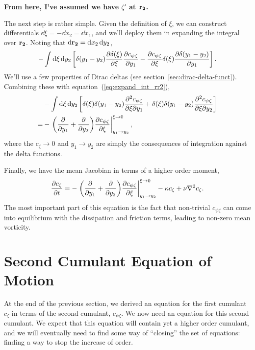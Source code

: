 \documentclass{paper}
\newcommand{\cz}{c_\zeta}
\newcommand{\cpz}{c_{\psi\zeta}}
\newcommand{\rr}[1]{\vb{r_{#1}}}
\begin{document}
\textbf{From here, I've assumed we have $\zeta'$ at $\rr2$.}

The next step is rather simple. Given the definition of $\xi$, we can construct differentials $\dd{\xi} = -\dd{x_2} = \dd{x_1}$, and we'll deploy them in expanding the integral over $\rr2$. Noting that $\dd{\rr2} = \dd{x_2}\dd{y_2}$,
\begin{equation}
  \label{eq:expand_int_rr2}
  - \int \dd{\xi} \dd{y_2} \left[ \delta(y_1 - y_2)\pdv{\delta(\xi)}{\xi} \pdv{\cpz}{y_1} - \pdv{\cpz}{\xi} \delta(\xi)\pdv{\delta(y_1 - y_2)}{y_1}\right].
\end{equation}
We'll use a few properties of Dirac deltas (see section~\ref{sec:dirac-delta-funct}). Combining these with equation~(\ref{eq:expand_int_rr2}),
\begin{equation}
  \label{eq:expand_int_rr2_dirac}
  \begin{split}
    & - \int \dd{\xi} \dd{y_2} \left[ \delta(\xi)\delta(y_1 - y_2)\pdv{\cpz}{\xi}{y_1} + \delta(\xi)\delta(y_1 - y_2)\pdv{\cpz}{\xi}{y_2}\right]\\
    = & -\eval{\qty(\pdv{y_1} + \pdv{y_2}) \pdv{\cpz}{\xi}}_{y_1 \to y_2}^{\xi \to 0},
  \end{split}
\end{equation}
where the $\cz \to 0$ and $y_1 \to y_2$ are simply the consequences of integration against the delta functions.

Finally, we have the mean Jacobian in terms of a higher order moment,
\begin{equation}
  \label{eq:first_cumulant_EOM}
  \pdv{\cz}{t} = -\eval{\qty(\pdv{y_1} + \pdv{y_2}) \pdv{\cpz}{\xi}}_{y_1 \to y_2}^{\xi \to 0} - \kappa \cz + \nu \laplacian{\cz}.
\end{equation}
The most important part of this equation is the fact that non-trivial $\cpz$ can come into equilibrium with the dissipation and friction terms, leading to non-zero mean vorticity.

\section{Second Cumulant Equation of Motion}
\label{sec:second-cumul-equat}
At the end of the previous section, we derived an equation for the first cumulant $\cz$ in terms of the second cumulant, $\cpz$. We now need an equation for this second cumulant. We expect that this equation will contain yet a higher order cumulant, and we will eventually need to find some way of ``closing'' the set of equations: finding a way to stop the increase of order.
\end{document}

